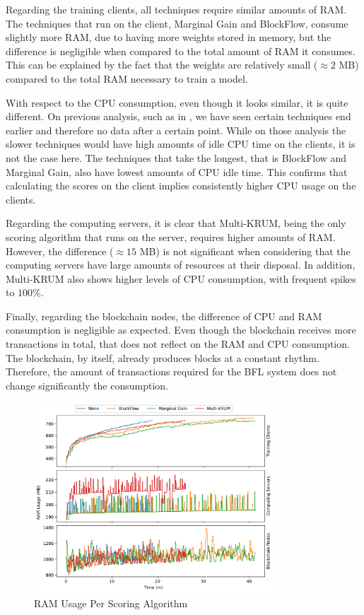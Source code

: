 Regarding the training clients, all techniques require similar amounts of RAM. The techniques that run on the client, Marginal Gain and BlockFlow, consume slightly more RAM, due to having more weights stored in memory, but the difference is negligible when compared to the total amount of RAM it consumes. This can be explained by the fact that the weights are relatively small ($\approx 2$ MB) compared to the total RAM necessary to train a model.

With respect to the CPU consumption, even though it looks similar, it is quite different. On previous analysis, such as in , we have seen certain techniques end earlier and therefore no data after a certain point. While on those analysis the slower techniques would have high amounts of idle CPU time on the clients, it is not the case here. The techniques that take the longest, that is BlockFlow and Marginal Gain, also have lowest amounts of CPU idle time. This confirms that calculating the scores on the client implies consistently higher CPU usage on the clients.

Regarding the computing servers, it is clear that Multi-KRUM, being the only scoring algorithm that runs on the server, requires higher amounts of RAM. However, the difference ($\approx 15$ MB) is not significant when considering that the computing servers have large amounts of resources at their disposal. In addition, Multi-KRUM also shows higher levels of CPU consumption, with frequent spikes to $100\%$.

Finally, regarding the blockchain nodes, the difference of CPU and RAM consumption is negligible as expected. Even though the blockchain receives more transactions in total, that does not reflect on the RAM and CPU consumption. The blockchain, by itself, already produces blocks at a constant rhythm. Therefore, the amount of transactions required for the BFL system does not change significantly the consumption.

\begin{figure}[!hpt]
    \centering
    \centering
    \includegraphics[width=0.8\textwidth]{graphics/scoring/ram.pdf}
    \caption{RAM Usage Per Scoring Algorithm}
    \label{fig:ram_scoring}
\end{figure}

